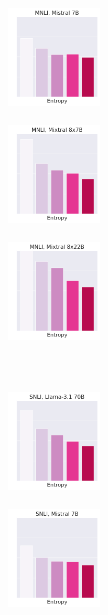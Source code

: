 \begin{figure}[t]
\begin{subfigure}[b]{0.2\textwidth}
        \caption{}
    \end{subfigure}
    \begin{subfigure}[b]{0.2\textwidth}
        \includegraphics[height=2.6cm]{figures/appendix/entropy_acc_mnli_matched_7B}
        \caption{}
    \end{subfigure}
    \begin{subfigure}[b]{0.2\textwidth}
        \includegraphics[height=2.6cm]{figures/appendix/entropy_acc_mnli_matched_8x7B}
        \caption{}
    \end{subfigure}
    \begin{subfigure}[b]{0.2\textwidth}
        \includegraphics[height=2.6cm]{figures/appendix/entropy_acc_mnli_matched_8x22B}
        \caption{}
    \end{subfigure}\\
    \begin{subfigure}[b]{0.2\textwidth}
        \includegraphics[height=2.6cm]{figures/appendix/entropy_acc_snli_70B}
        \caption{}
    \end{subfigure}
    \begin{subfigure}[b]{0.2\textwidth}
        \includegraphics[height=2.6cm]{figures/appendix/entropy_acc_snli_7B}

\end{subfigure}
\end{figure}
